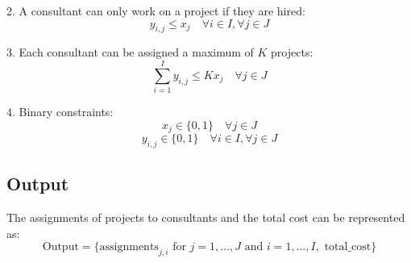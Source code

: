 \documentclass{article}
\begin{document}
2. A consultant can only work on a project if they are hired:
\[
y_{i,j} \leq x_j \quad \forall i \in I, \forall j \in J
\]

3. Each consultant can be assigned a maximum of $K$ projects:
\[
\sum_{i=1}^{I} y_{i,j} \leq K x_j \quad \forall j \in J
\]

4. Binary constraints:
\[
x_j \in \{0, 1\} \quad \forall j \in J
\]
\[
y_{i,j} \in \{0, 1\} \quad \forall i \in I, \forall j \in J
\]

\subsection*{Output}
The assignments of projects to consultants and the total cost can be represented as:
\[
\text{Output} = \{ \text{assignments}_{j,i} \text{ for } j = 1, \ldots, J \text{ and } i = 1, \ldots, I, \text{ total\_cost} \}
\]
\end{document}

